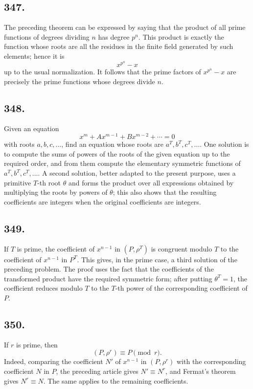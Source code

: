 \documentclass[12pt]{article}
\begin{document}
\subsection*{347.}
The preceding theorem can be expressed by saying that the product of all prime functions of degrees dividing $n$ has degree $p^n$. This product is exactly the function whose roots are all the residues in the finite field generated by such elements; hence it is
\[
x^{p^n}-x
\]
up to the usual normalization. It follows that the prime factors of $x^{p^n}-x$ are precisely the prime functions whose degrees divide $n$.

\subsection*{348.}
Given an equation
\[
x^m+Ax^{m-1}+Bx^{m-2}+\cdots=0
\]
with roots $a,b,c,\ldots$, find an equation whose roots are $a^T,b^T,c^T,\ldots$. One solution is to compute the sums of powers of the roots of the given equation up to the required order, and from them compute the elementary symmetric functions of $a^T,b^T,c^T,\ldots$. A second solution, better adapted to the present purpose, uses a primitive $T$-th root $\theta$ and forms the product over all expressions obtained by multiplying the roots by powers of $\theta$; this also shows that the resulting coefficients are integers when the original coefficients are integers.

\subsection*{349.}
If $T$ is prime, the coefficient of $x^{n-1}$ in $(P,\rho^T)$ is congruent modulo $T$ to the coefficient of $x^{n-1}$ in $P^T$. This gives, in the prime case, a third solution of the preceding problem. The proof uses the fact that the coefficients of the transformed product have the required symmetric form; after putting $\theta^T=1$, the coefficient reduces modulo $T$ to the $T$-th power of the corresponding coefficient of $P$.

\subsection*{350.}
If $r$ is prime, then
\[
(P,\rho^r)\equiv P\pmod r.
\]
Indeed, comparing the coefficient $N'$ of $x^{n-1}$ in $(P,\rho^r)$ with the corresponding coefficient $N$ in $P$, the preceding article gives $N'\equiv N^r$, and Fermat's theorem gives $N^r\equiv N$. The same applies to the remaining coefficients.
\end{document}
